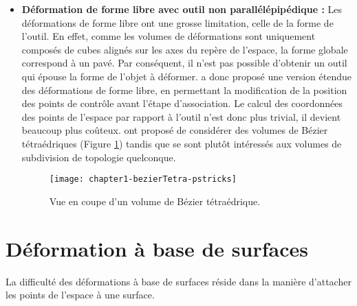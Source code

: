\begin{itemize}
\item{\textbf{Déformation de forme libre avec outil non parallélépipédique :}}
Les déformations de forme libre ont une grosse limitation, celle de la forme
de l'outil. En effet, comme les volumes de déformations sont uniquement
composés de cubes alignés sur les axes du repère de l'espace, la forme globale
correspond à un pavé. Par conséquent, il n'est pas possible d'obtenir un outil
qui épouse la forme de l'objet à déformer. \cite{Coq90} a donc proposé une
version étendue des déformations de forme libre, en permettant la modification
de la position des points de contrôle avant l'étape d'association. Le calcul
des coordonnées des points de l'espace par rapport à l'outil n'est donc plus
trivial, il devient beaucoup plus coûteux. \cite{BBT97} ont proposé de
considérer des volumes de Bézier tétraédriques (Figure \ref{SURTet}) tandis
que \cite{MJ96} se sont plutôt intéressés aux volumes de subdivision de
topologie quelconque.

\begin{figure}[!ht]
	\texttt{[image: chapter1-bezierTetra-pstricks]}
  \caption[Volume de Bézier tétraédrique] {Vue en coupe d'un volume de
  Bézier tétraédrique.}
  \label{SURTet}
\end{figure}

\end{itemize}

\section{Déformation à base de surfaces} 

La difficulté des déformations à base de surfaces réside dans la manière
d'attacher les points de l'espace à une surface.

